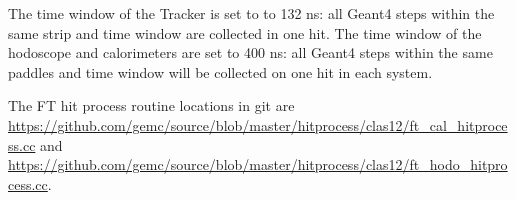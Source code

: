 \noindent The time window  of the Tracker is set to to 132 ns: all Geant4 steps within the same strip and time window are collected in one hit.
The time window of the hodoscope and calorimeters are set to 400 ns: all Geant4 steps within the same paddles and time window
will be collected on one hit in each system.

The FT hit process routine locations in git are \url{https://github.com/gemc/source/blob/master/hitprocess/clas12/ft_cal_hitprocess.cc} and
\url{https://github.com/gemc/source/blob/master/hitprocess/clas12/ft_hodo_hitprocess.cc}.
